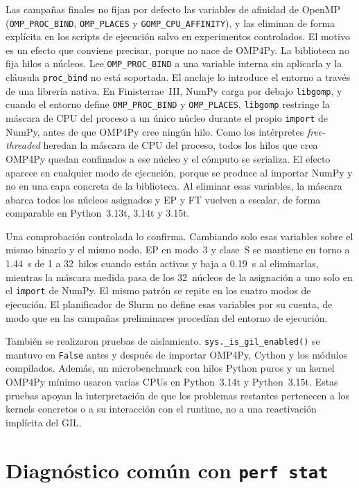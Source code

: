 Las campañas finales no fijan por defecto las variables de afinidad de OpenMP
(\texttt{OMP\_PROC\_BIND}, \texttt{OMP\_PLACES} y \texttt{GOMP\_CPU\_AFFINITY}),
y las eliminan de forma explícita en los scripts de ejecución salvo en
experimentos controlados. El motivo es un efecto que conviene precisar, porque
no nace de OMP4Py. La biblioteca no fija hilos a núcleos. Lee
\texttt{OMP\_PROC\_BIND} a una variable interna sin aplicarla y la cláusula
\texttt{proc\_bind} no está soportada. El anclaje lo introduce el entorno a
través de una librería nativa. En Finisterrae~III, NumPy carga por debajo
\texttt{libgomp}, y cuando el entorno define \texttt{OMP\_PROC\_BIND} y
\texttt{OMP\_PLACES}, \texttt{libgomp} restringe la máscara de CPU del proceso a
un único núcleo durante el propio \texttt{import} de NumPy, antes de que OMP4Py
cree ningún hilo. Como los intérpretes \emph{free-threaded} heredan la máscara
de CPU del proceso, todos los hilos que crea OMP4Py quedan confinados a ese
núcleo y el cómputo se serializa. El efecto aparece en cualquier modo de
ejecución, porque se produce al importar NumPy y no en una capa concreta de la
biblioteca. Al eliminar esas variables, la máscara abarca todos los núcleos
asignados y EP y FT vuelven a escalar, de forma comparable en Python~3.13t,
3.14t y 3.15t.

Una comprobación controlada lo confirma. Cambiando solo esas variables sobre el
mismo binario y el mismo nodo, EP en modo~3 y clase~S se mantiene en torno a
1.44~s de 1 a 32~hilos cuando están activas y baja a 0.19~s al eliminarlas,
mientras la máscara medida pasa de los 32~núcleos de la asignación a uno solo en
el \texttt{import} de NumPy. El mismo patrón se repite en los cuatro modos de
ejecución. El planificador de Slurm no
define esas variables por su cuenta, de modo que en las campañas preliminares
procedían del entorno de ejecución.

También se realizaron pruebas de aislamiento. \texttt{sys.\_is\_gil\_enabled()}
se mantuvo en \texttt{False} antes y después de importar OMP4Py, Cython y los
módulos compilados. Además, un microbenchmark con hilos Python puros y un
kernel OMP4Py mínimo usaron varias CPUs en Python~3.14t y Python~3.15t. Estas
pruebas apoyan la interpretación de que los problemas restantes pertenecen a
los kernels concretos o a su interacción con el runtime, no a una reactivación
implícita del GIL.


\section{Diagnóstico común con \texttt{perf stat}}
\label{sec:profiling-perf-comun}

